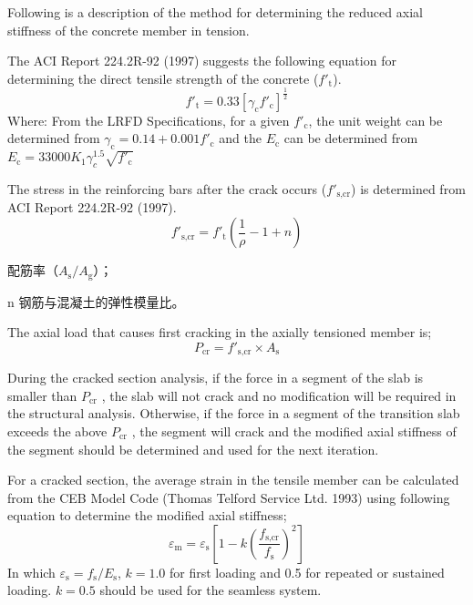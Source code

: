 Following is a description of the method for determining the reduced axial stiffness of the concrete member in tension.

The ACI Report 224.2R-92 (1997) suggests the following equation for determining the direct tensile strength of the concrete ($f'_\text{t}$).
\begin{equation}
  f'_\text{t} = 0.33\left[ \gamma_\text{c} f'_\text{c}\right]^{\frac12}
\end{equation}
Where: From the LRFD Specifications, for a given $f'_\text{c}$, the unit weight can be determined from $\gamma_\text{c} = 0.14 + 0.001f'_\text{c}$ and
the $E_\text{c}$ can be determined from $E_\text{c}=33000K_1\gamma_c^{1.5}\sqrt{f'_\text{c}}$

The stress in the reinforcing bars after the crack occurs ($f'_\text{s,cr}$) is determined from ACI Report 224.2R-92 (1997).
\begin{equation}
  f'_\text{s,cr} = f'_\text{t} \left( \frac{1}{\rho} -1 +n \right)
\end{equation}
\begin{EqDesc}{\rho}
  \item [\rho] 配筋率（$A_\text{s}/A_\text{g}$）；
  \item [n] 钢筋与混凝土的弹性模量比。
\end{EqDesc}

The axial load that causes first cracking in the axially tensioned member is;
\begin{equation}
  P_\text{cr} = f'_\text{s,cr} \times A_\text{s}
\end{equation}

During the cracked section analysis, if the force in a segment of the slab is smaller than $P_\text{cr}$ , the slab will not crack and no modification will be required in the structural analysis. Otherwise, if the force in a segment of the transition slab exceeds the above $P_\text{cr}$ , the segment will crack and the modified axial stiffness of the segment should be determined and used for the next iteration.

For a cracked section, the average strain in the tensile member can be calculated from the CEB Model Code (Thomas Telford Service Ltd. 1993) using following equation to determine the modified axial stiffness;
\begin{equation}
  \varepsilon_\text{m}=\varepsilon_\text{s}\left[ 1-k \left( \frac{f_\text{s,cr}}{f_\text{s}}\right)^2 \right]
\end{equation}
In which $\varepsilon_\text{s}=f_\text{s}/E_\text{s}$, $k = 1.0$ for first loading and 0.5 for repeated or sustained loading. $k=0.5$ should be used
for the seamless system.

